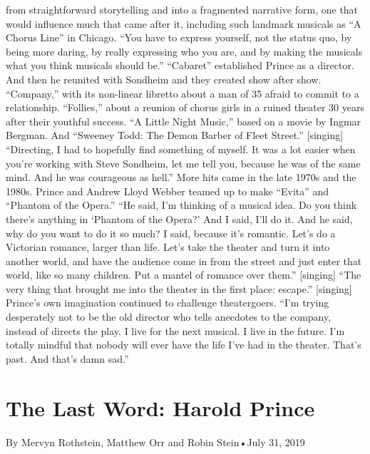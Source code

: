 \begin{itemize}
  from straightforward storytelling and into a fragmented narrative
  form, one that would influence much that came after it, including such
  landmark musicals as ``A Chorus Line'' in Chicago. ``You have to
  express yourself, not the status quo, by being more daring, by really
  expressing who you are, and by making the musicals what you think
  musicals should be.'' ``Cabaret'' established Prince as a director.
  And then he reunited with Sondheim and they created show after show.
  ``Company,'' with its non-linear libretto about a man of 35 afraid to
  commit to a relationship. ``Follies,'' about a reunion of chorus girls
  in a ruined theater 30 years after their youthful success. ``A Little
  Night Music,'' based on a movie by Ingmar Bergman. And ``Sweeney Todd:
  The Demon Barber of Fleet Street.'' {[}singing{]} ``Directing, I had
  to hopefully find something of myself. It was a lot easier when you're
  working with Steve Sondheim, let me tell you, because he was of the
  same mind. And he was courageous as hell.'' More hits came in the late
  1970s and the 1980s. Prince and Andrew Lloyd Webber teamed up to make
  ``Evita'' and ``Phantom of the Opera.'' ``He said, I'm thinking of a
  musical idea. Do you think there's anything in `Phantom of the Opera?'
  And I said, I'll do it. And he said, why do you want to do it so much?
  I said, because it's romantic. Let's do a Victorian romance, larger
  than life. Let's take the theater and turn it into another world, and
  have the audience come in from the street and just enter that world,
  like so many children. Put a mantel of romance over them.''
  {[}singing{]} ``The very thing that brought me into the theater in the
  first place: escape.'' {[}singing{]} Prince's own imagination
  continued to challenge theatergoers. ``I'm trying desperately not to
  be the old director who tells anecdotes to the company, instead of
  directs the play. I live for the next musical. I live in the future.
  I'm totally mindful that nobody will ever have the life I've had in
  the theater. That's past. And that's damn sad.''
\end{itemize}

\hypertarget{the-last-word-harold-prince-1}{%
\section{The Last Word: Harold
Prince}\label{the-last-word-harold-prince-1}}

By Mervyn Rothstein, Matthew Orr and Robin Stein•July 31, 2019

